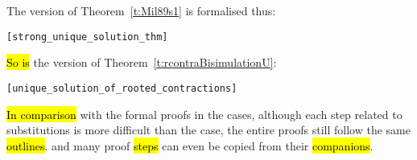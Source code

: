 The \multivariate version of Theorem~\ref{t:Mil89s1} is formalised thus:
\begin{alltt}
\HOLTokenTurnstile{}    \HOLSymConst{\HOLTokenConj{}}    \HOLSymConst{\HOLTokenConj{}}
    \HOLSymConst{\HOLTokenIn{}}     \HOLSymConst{\HOLTokenConj{}}
    \HOLSymConst{\HOLTokenIn{}}     \HOLSymConst{\HOLTokenImp{}}
    \HOLSymConst{\HOLTokenStrongEQ} \hfill{[strong_unique_solution_thm]}
\end{alltt}

\hl{So is} the \multivariate version of Theorem~\ref{t:rcontraBisimulationU}:
\begin{alltt}
\HOLTokenTurnstile{}    \HOLSymConst{\HOLTokenConj{}}    \HOLSymConst{\HOLTokenConj{}}
    \HOLSymConst{\HOLTokenIn{}}     \HOLSymConst{\HOLTokenConj{}}
    \HOLSymConst{\HOLTokenIn{}}     \HOLSymConst{\HOLTokenImp{}}
    \HOLSymConst{\HOLTokenObsCongr} \hfill{[unique_solution_of_rooted_contractions]}
\end{alltt}
\hl{In comparison} with the formal proofs in the \univariate cases, although each
step related to \multivariate substitutions is more difficult than
the \univariate case, the entire proofs still follow the same \hl{outlines}.
and many proof \hl{steps} can even be copied from their \univariate \hl{companions}.
